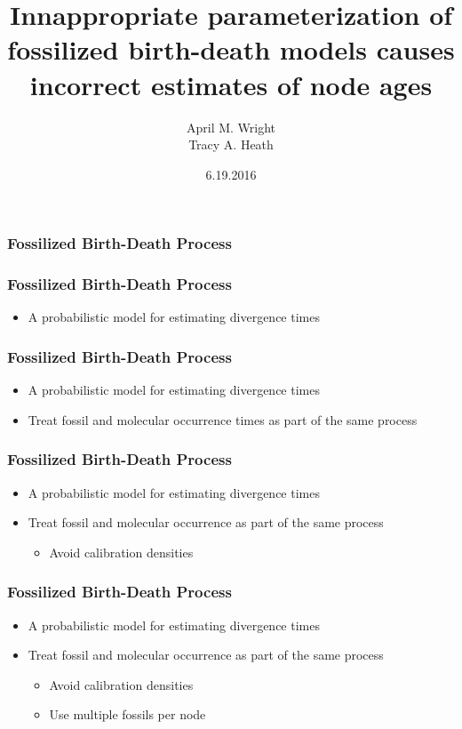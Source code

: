 \documentclass[]{beamer}
\begin{document}
 \graphicspath{{images/}}

\title{Innappropriate parameterization of fossilized birth-death models causes incorrect estimates of node ages}
\author{April M. Wright \dag \ddag \\ Tracy A. Heath \dag}
\date{6.19.2016}
\maketitle

\begin{frame}
\frametitle{Fossilized Birth-Death Process}
\end{frame}

\begin{frame}
\frametitle{Fossilized Birth-Death Process}
\begin{itemize}
\item A probabilistic model for estimating divergence times
\end{itemize}
\end{frame}

\begin{frame}
\frametitle{Fossilized Birth-Death Process}
\begin{itemize}
\item A probabilistic model for estimating divergence times
\item Treat fossil and molecular occurrence times as part of the same process
\end{itemize}
\end{frame}

\begin{frame}
\frametitle{Fossilized Birth-Death Process}
\begin{itemize}
\item A probabilistic model for estimating divergence times
\item Treat fossil and molecular occurrence as part of the same process 
\begin{itemize}
	\item Avoid calibration densities 
\end{itemize}	
\end{itemize}
\end{frame}

\begin{frame}
\frametitle{Fossilized Birth-Death Process}
\begin{itemize}
\item A probabilistic model for estimating divergence times
\item Treat fossil and molecular occurrence as part of the same process 
\begin{itemize}
	\item Avoid calibration densities 
	\item Use multiple fossils per node
\end{itemize}	
\end{itemize}
\end{frame}
\end{document}
